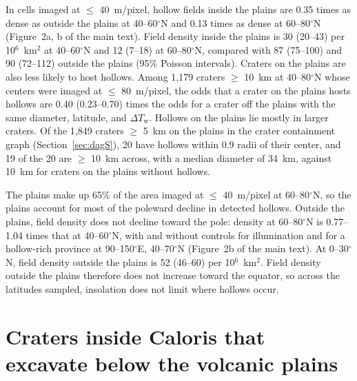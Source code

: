 \documentclass{planetary}
\begin{document}
In cells imaged at $\leq$ 40~m/pixel, hollow fields inside the plains are 0.35 times as dense as outside the plains at 40--60$^\circ$N and 0.13 times as dense at 60--80$^\circ$N (Figure~2a, b of the main text). Field density inside the plains is 30 (20--43) per 10$^6$~km$^2$ at 40--60$^\circ$N and 12 (7--18) at 60--80$^\circ$N, compared with 87 (75--100) and 90 (72--112) outside the plains (95\% Poisson intervals). Craters on the plains are also less likely to host hollows. Among 1,179 craters $\geq$ 10~km at 40--80$^\circ$N whose centers were imaged at $\leq$ 80~m/pixel, the odds that a crater on the plains hosts hollows are 0.40 (0.23--0.70) times the odds for a crater off the plains with the same diameter, latitude, and $\Delta T_\mathrm{w}$. Hollows on the plains lie mostly in larger craters. Of the 1,849 craters $\geq$ 5~km on the plains in the crater containment graph (Section~\ref{sec:dagS}), 20 have hollows within 0.9 radii of their center, and 19 of the 20 are $\geq$ 10~km across, with a median diameter of 34~km, against 10~km for craters on the plains without hollows.

The plains make up 65\% of the area imaged at $\leq$ 40~m/pixel at 60--80$^\circ$N, so the plains account for most of the poleward decline in detected hollows. Outside the plains, field density does not decline toward the pole: density at 60--80$^\circ$N is 0.77--1.04 times that at 40--60$^\circ$N, with and without controls for illumination and for a hollow-rich province at 90--150$^\circ$E, 40--70$^\circ$N (Figure~2b of the main text). At 0--30$^\circ$N, field density outside the plains is 52 (46--60) per 10$^6$~km$^2$. Field density outside the plains therefore does not increase toward the equator, so across the latitudes sampled, insolation does not limit where hollows occur.

\clearpage

\section{Craters inside Caloris that excavate below the volcanic plains}
\label{sec:calorisS}
\end{document}
